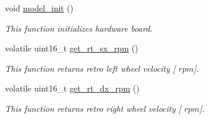 \begin{DoxyCompactItemize}
void \mbox{\hyperlink{group___board__model__group_gace5a444da39d4366693503c53f0841c2}{model\+\_\+init}} ()
\begin{DoxyCompactList}\small\item\em This function initializes hardware board. \end{DoxyCompactList}\item 
volatile uint16\+\_\+t \mbox{\hyperlink{group___board__model__group_ga81c1dfd585ff1f0b26b38148909e064c}{get\+\_\+rt\+\_\+sx\+\_\+rpm}} ()
\begin{DoxyCompactList}\small\item\em This function returns retro left wheel velocity \mbox{[} $rpm$\mbox{]}. \end{DoxyCompactList}\item 
volatile uint16\+\_\+t \mbox{\hyperlink{group___board__model__group_ga812f59d2bf258b811a7ff9184ba23e78}{get\+\_\+rt\+\_\+dx\+\_\+rpm}} ()
\begin{DoxyCompactList}\small\item\em This function returns retro right wheel velocity \mbox{[} $rpm$\mbox{]}. \end{DoxyCompactList}\end{DoxyCompactItemize}

